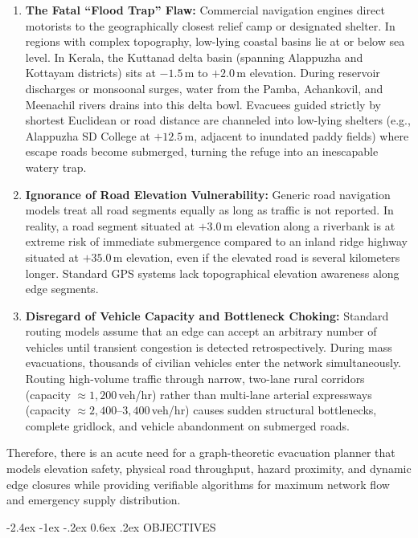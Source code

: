 \documentclass[12pt,oneside]{report}
\makeatletter
\renewcommand{\section}{\@startsection{section}{1}{\z@}%
  {-2.4ex \@plus -1ex \@minus -.2ex}%
  {0.6ex \@plus .2ex}%
  {\normalfont\large\bfseries}}
\makeatother
\begin{document}
\begin{enumerate}
    \item \textbf{The Fatal ``Flood Trap'' Flaw:} Commercial navigation engines direct motorists to the geographically closest relief camp or designated shelter. In regions with complex topography, low-lying coastal basins lie at or below sea level. In Kerala, the Kuttanad delta basin (spanning Alappuzha and Kottayam districts) sits at $-1.5$\,m to $+2.0$\,m elevation. During reservoir discharges or monsoonal surges, water from the Pamba, Achankovil, and Meenachil rivers drains into this delta bowl. Evacuees guided strictly by shortest Euclidean or road distance are channeled into low-lying shelters (e.g., Alappuzha SD College at $+12.5$\,m, adjacent to inundated paddy fields) where escape roads become submerged, turning the refuge into an inescapable watery trap.
    
    \item \textbf{Ignorance of Road Elevation Vulnerability:} Generic road navigation models treat all road segments equally as long as traffic is not reported. In reality, a road segment situated at $+3.0$\,m elevation along a riverbank is at extreme risk of immediate submergence compared to an inland ridge highway situated at $+35.0$\,m elevation, even if the elevated road is several kilometers longer. Standard GPS systems lack topographical elevation awareness along edge segments.
    
    \item \textbf{Disregard of Vehicle Capacity and Bottleneck Choking:} Standard routing models assume that an edge can accept an arbitrary number of vehicles until transient congestion is detected retrospectively. During mass evacuations, thousands of civilian vehicles enter the network simultaneously. Routing high-volume traffic through narrow, two-lane rural corridors (capacity $\approx 1,200$\,veh/hr) rather than multi-lane arterial expressways (capacity $\approx 2,400$--$3,400$\,veh/hr) causes sudden structural bottlenecks, complete gridlock, and vehicle abandonment on submerged roads.
\end{enumerate}

Therefore, there is an acute need for a graph-theoretic evacuation planner that models elevation safety, physical road throughput, hazard proximity, and dynamic edge closures while providing verifiable algorithms for maximum network flow and emergency supply distribution.

\section{OBJECTIVES}
\end{document}
